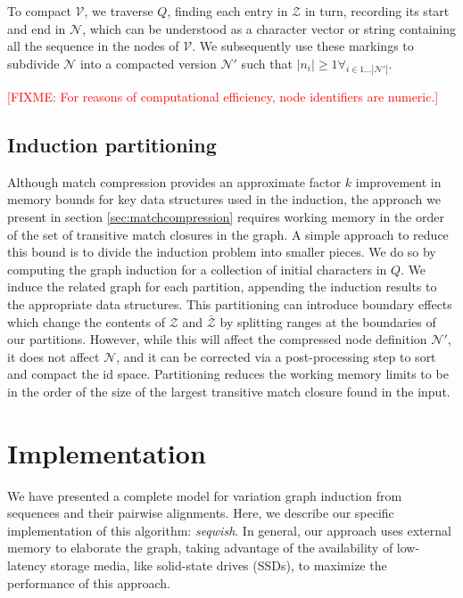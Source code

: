 \documentclass{bioinfo}
\theoremstyle{definition}
\newcommand{\red}[1]{{\textcolor{Red}{#1}}}
\newcommand{\FIXME}[1]{\red{[FIXME: #1]}}
\begin{document}
To compact $\mathcal{V}$, we traverse $Q$, finding each entry in $\mathcal{Z}$ in turn, recording its start and end in $\mathcal{N}$, which can be understood as a character vector or string containing all the sequence in the nodes of $\mathcal{V}$.
We subsequently use these markings to subdivide $\mathcal{N}$ into a compacted version $\mathcal{N}'$ such that $|n_i| \ge 1 \forall_{i \in 1 \ldots |\mathcal{N}'|}$.

\FIXME{For reasons of computational efficiency, node identifiers are numeric.}

\subsection{Induction partitioning}

Although match compression provides an approximate factor $k$ improvement in memory bounds for key data structures used in the induction, the approach we present in section \ref{sec:matchcompression} requires working memory in the order of the set of transitive match closures in the graph.
A simple approach to reduce this bound is to divide the induction problem into smaller pieces.
We do so by computing the graph induction for a collection of initial characters in $Q$.
We induce the related graph for each partition, appending the induction results to the appropriate data structures.
This partitioning can introduce boundary effects which change the contents of $\mathcal{Z}$ and $\bar{\mathcal{Z}}$ by splitting ranges at the boundaries of our partitions.
However, while this will affect the compressed node definition $\mathcal{N}'$, it does not affect $\mathcal{N}$, and it can be corrected via a post-processing step to sort and compact the id space.
Partitioning reduces the working memory limits to be in the order of the size of the largest transitive match closure found in the input.

\section{Implementation}

We have presented a complete model for variation graph induction from sequences and their pairwise alignments.
Here, we describe our specific implementation of this algorithm: \textit{seqwish}.
In general, our approach uses external memory to elaborate the graph, taking advantage of the availability of low-latency storage media, like solid-state drives (SSDs), to maximize the performance of this approach.
\end{document}
